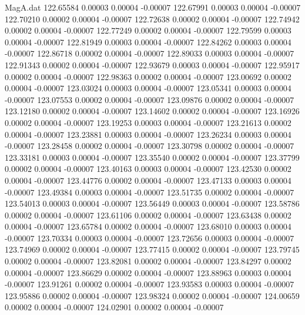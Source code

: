 \begin{filecontents}{MagA.dat}
 122.65584    0.00003    0.00004   -0.00007
 122.67991    0.00003    0.00004   -0.00007
 122.70210    0.00002    0.00004   -0.00007
 122.72638    0.00002    0.00004   -0.00007
 122.74942    0.00002    0.00004   -0.00007
 122.77249    0.00002    0.00004   -0.00007
 122.79599    0.00003    0.00004   -0.00007
 122.81949    0.00003    0.00004   -0.00007
 122.84262    0.00003    0.00004   -0.00007
 122.86718    0.00002    0.00004   -0.00007
 122.89033    0.00003    0.00004   -0.00007
 122.91343    0.00002    0.00004   -0.00007
 122.93679    0.00003    0.00004   -0.00007
 122.95917    0.00002    0.00004   -0.00007
 122.98363    0.00002    0.00004   -0.00007
 123.00692    0.00002    0.00004   -0.00007
 123.03024    0.00003    0.00004   -0.00007
 123.05341    0.00003    0.00004   -0.00007
 123.07553    0.00002    0.00004   -0.00007
 123.09876    0.00002    0.00004   -0.00007
 123.12180    0.00002    0.00004   -0.00007
 123.14602    0.00002    0.00004   -0.00007
 123.16926    0.00002    0.00004   -0.00007
 123.19253    0.00003    0.00004   -0.00007
 123.21613    0.00002    0.00004   -0.00007
 123.23881    0.00003    0.00004   -0.00007
 123.26234    0.00003    0.00004   -0.00007
 123.28458    0.00002    0.00004   -0.00007
 123.30798    0.00002    0.00004   -0.00007
 123.33181    0.00003    0.00004   -0.00007
 123.35540    0.00002    0.00004   -0.00007
 123.37799    0.00002    0.00004   -0.00007
 123.40163    0.00003    0.00004   -0.00007
 123.42530    0.00002    0.00004   -0.00007
 123.44776    0.00002    0.00004   -0.00007
 123.47133    0.00003    0.00004   -0.00007
 123.49384    0.00003    0.00004   -0.00007
 123.51735    0.00002    0.00004   -0.00007
 123.54013    0.00003    0.00004   -0.00007
 123.56449    0.00003    0.00004   -0.00007
 123.58786    0.00002    0.00004   -0.00007
 123.61106    0.00002    0.00004   -0.00007
 123.63438    0.00002    0.00004   -0.00007
 123.65784    0.00002    0.00004   -0.00007
 123.68010    0.00003    0.00004   -0.00007
 123.70334    0.00003    0.00004   -0.00007
 123.72656    0.00003    0.00004   -0.00007
 123.74969    0.00002    0.00004   -0.00007
 123.77415    0.00002    0.00004   -0.00007
 123.79745    0.00002    0.00004   -0.00007
 123.82081    0.00002    0.00004   -0.00007
 123.84297    0.00002    0.00004   -0.00007
 123.86629    0.00002    0.00004   -0.00007
 123.88963    0.00003    0.00004   -0.00007
 123.91261    0.00002    0.00004   -0.00007
 123.93583    0.00003    0.00004   -0.00007
 123.95886    0.00002    0.00004   -0.00007
 123.98324    0.00002    0.00004   -0.00007
 124.00659    0.00002    0.00004   -0.00007
 124.02901    0.00002    0.00004   -0.00007

\end{filecontents}
